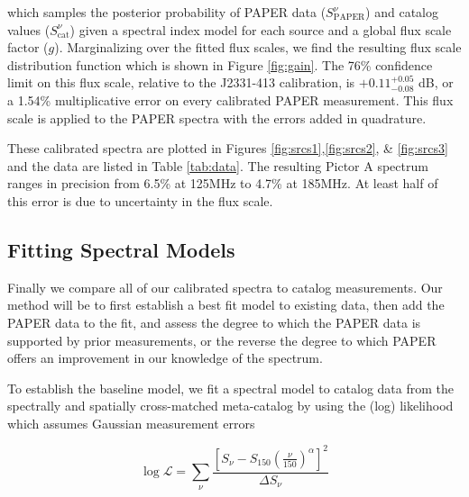 \documentclass[preprint]{aastex}
\newcommand{\logL}{\log\mathcal{L}}
\newcommand{\PAPER}{\mathrm{PAPER}}
\begin{document}
which samples the posterior probability of PAPER data ($S_\PAPER^{\nu}$) and
catalog values ($S_\textrm{cat}^{\nu}$) given a spectral index model for each source and
a global flux scale factor ($g$).
Marginalizing over the fitted flux scales, we find the resulting flux scale distribution function which is shown in Figure
\ref{fig:gain}. The 76\% confidence limit on this flux scale, relative to the
J2331-413 calibration, is  $+0.11 ^{+0.05}_{-0.08}$ dB, or a 1.54\%
multiplicative error on every calibrated PAPER measurement.  This flux scale is applied to the PAPER spectra
with the errors added in quadrature.

These calibrated spectra are plotted in Figures \ref{fig:srcs1},\ref{fig:srcs2},
\& \ref{fig:srcs3} and the data are listed in Table \ref{tab:data}.  The
resulting Pictor A spectrum ranges in precision from 6.5\% at 125MHz to 4.7\%
at 185MHz. At least half of this error is due to uncertainty in the flux scale.  



\subsection{Fitting Spectral Models}
\label{sec:fitting_models}

Finally we compare all of our  calibrated spectra to catalog measurements. Our method
will be to first establish a best fit model to existing data, then add the PAPER data
to the fit, and assess the degree to which the PAPER data is supported by prior measurements, or the reverse
the degree to which PAPER offers an improvement in our knowledge of the spectrum.

 To establish the baseline model, we
fit a spectral model to catalog data from the spectrally and spatially
cross-matched meta-catalog by \citet{Vollmer:2010p6422} using the
 (log) likelihood which assumes Gaussian measurement errors

\begin{equation}
\logL = \sum_\nu{\frac{\left[S_\nu - S_{150}\left(\frac{\nu}{150}\right)^\alpha\right]^2}{\Delta S_\nu} }
\end{equation}
\end{document}
